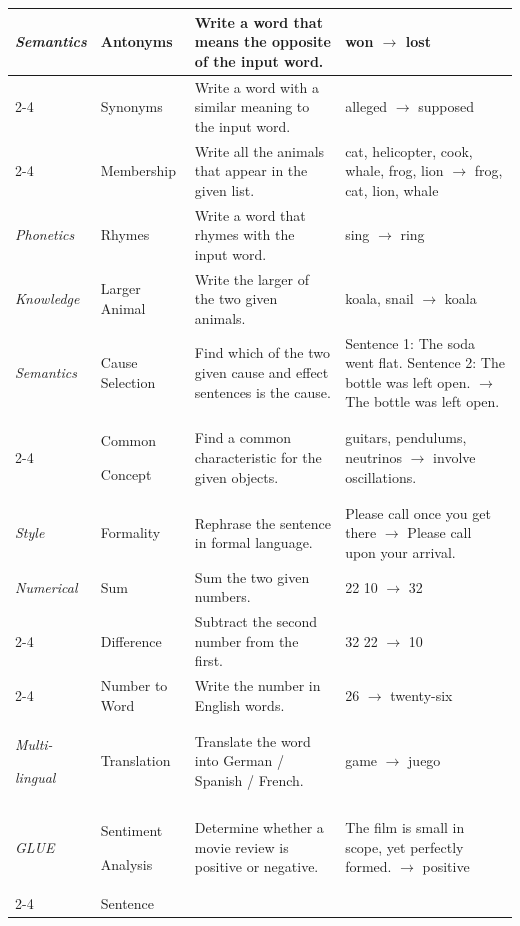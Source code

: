 \begin{table}[H]
\begin{tabular}{@{}p{}@{}p{}@{}p{}p{}@{}}
\textit{Semantics} & Antonyms       & Write a word that means the opposite of the input word. & won $\rightarrow$ lost \\
\cmidrule{2-4}
                                   & Synonyms       & Write a word with a similar meaning to the input word.  & alleged $\rightarrow$  supposed\\
\cmidrule{2-4}
                                   & Membership    & Write all the animals that appear in the given list.    & cat, helicopter, cook, whale, frog, lion $\rightarrow$  frog, cat, lion, whale \\
\midrule
\textit{Phonetics}                          & Rhymes         & Write a word that rhymes with the input word.           & sing $\rightarrow$  ring \\
\midrule
\textit{Knowledge}                    & Larger Animal  & Write the larger of the two given animals.              & koala, snail $\rightarrow$  koala\\
\midrule
\textit{Semantics} & Cause Selection & Find which of the two given cause and effect sentences is the cause. & Sentence 1: The soda went flat. Sentence 2: The bottle was left open. $\rightarrow$  The bottle was left open.\\
\cmidrule{2-4}
& Common

Concept & Find a common characteristic for the given objects. & guitars, pendulums, neutrinos $\rightarrow$  involve oscillations.\\
\midrule
\textit{Style} & Formality & Rephrase the sentence in formal language. & Please call once you get there $\rightarrow$  Please call upon your arrival.\\
\midrule
\textit{Numerical}         & Sum            & Sum the two given numbers.   & 22 10 $\rightarrow$  32 \\
\cmidrule{2-4}
                                   & Difference     & Subtract the second number from the first.  & 32 22 $\rightarrow$  10 \\
\cmidrule{2-4}
                                   & Number to Word & Write the number in English words.  & 26 $\rightarrow$  twenty-six \\
\midrule
\textit{Multi-}

\textit{lingual} & Translation    & Translate the word into German / Spanish / French.    & game $\rightarrow$  juego\\
\midrule
\textit{GLUE} & Sentiment 

Analysis & Determine whether a movie review is positive or negative. & The film is small in scope, yet perfectly formed. $\rightarrow$  positive \\
\cmidrule{2-4}
& Sentence 


\end{tabular}
\end{table}
